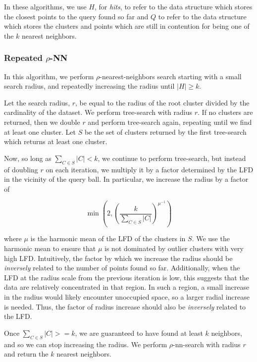 In these algorithms, we use $H$, for \emph{hits}, to refer to the data structure which stores the closest points to the query found so far and $Q$ to refer to the data structure which stores the clusters and points which are still in contention for being one of the $k$ nearest neighbors.


\subsubsection{Repeated \texorpdfstring{$\rho$}{p}-NN}
\label{subsubsec:methods:knn-search:repeated-rnn}

In this algorithm, we perform $\rho$-nearest-neighbors search starting with a small search radius, and repeatedly increasing the radius until $|H| \geq k$.

Let the search radius, $r$, be equal to the radius of the root cluster divided by the cardinality of the dataset.
We perform tree-search with radius $r$.
If no clusters are returned, then we double $r$ and perform tree-search again, repeating until we find at least one cluster.
Let $S$ be the set of clusters returned by the first tree-search which returns at least one cluster.

Now, so long as $\sum_{C \in S} |C| < k$, we continue to perform tree-search, but instead of doubling $r$ on each iteration, we multiply it by a factor determined by the LFD in the vicinity of the query ball. 
In particular, we increase the radius by a factor of

\begin{equation}
    \min \left(2, \left( {\frac{k}{\sum_{C \in S} |C|}} \right)^{\mu^{-1}} \right)
    \label{eq:repeated-rnn-factor}
\end{equation}

where $\mu$ is the harmonic mean of the LFD of the clusters in $S$.
We use the harmonic mean to ensure that $\mu$ is not dominated by outlier clusters with very high LFD. 
Intuitively, the factor by which we increase the radius should be \emph{inversely} related to the number of points found so far. 
Additionally, when the LFD at the radius scale from the previous iteration is low, this suggests that the data are relatively concentrated in that region.
In such a region, a small increase in the radius would likely encounter unoccupied space, so a larger radial increase is needed.
Thus, the factor of radius increase should also be \emph{inversely} related to the LFD.

Once $\sum_{C \in S} |C| >= k$, we are guaranteed to have found at least $k$ neighbors, and so we can stop increasing the radius.
We perform $\rho$-nn-search with radius $r$ and return the $k$ nearest neighbors.

